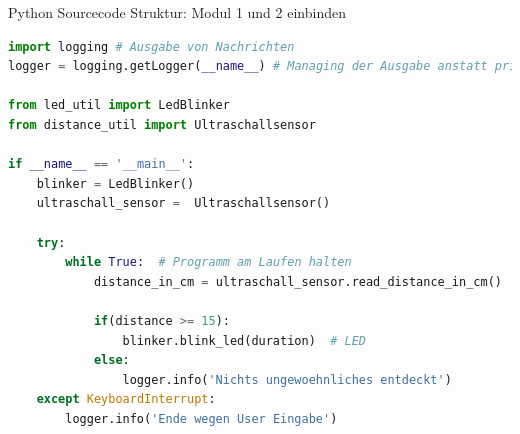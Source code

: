 \begin{frame}[fragile]{Python Sourcecode Struktur: Modul 1  und 2 einbinden}
\begin{lstlisting}[language=Python]
import logging # Ausgabe von Nachrichten
logger = logging.getLogger(__name__) # Managing der Ausgabe anstatt print() Funktion

from led_util import LedBlinker
from distance_util import Ultraschallsensor

if __name__ == '__main__':
    blinker = LedBlinker()
    ultraschall_sensor =  Ultraschallsensor()

    try:
        while True:  # Programm am Laufen halten
            distance_in_cm = ultraschall_sensor.read_distance_in_cm()

            if(distance >= 15):
                blinker.blink_led(duration)  # LED
            else:
                logger.info('Nichts ungewoehnliches entdeckt')
    except KeyboardInterrupt:
        logger.info('Ende wegen User Eingabe')
\end{lstlisting}
\end{frame}




